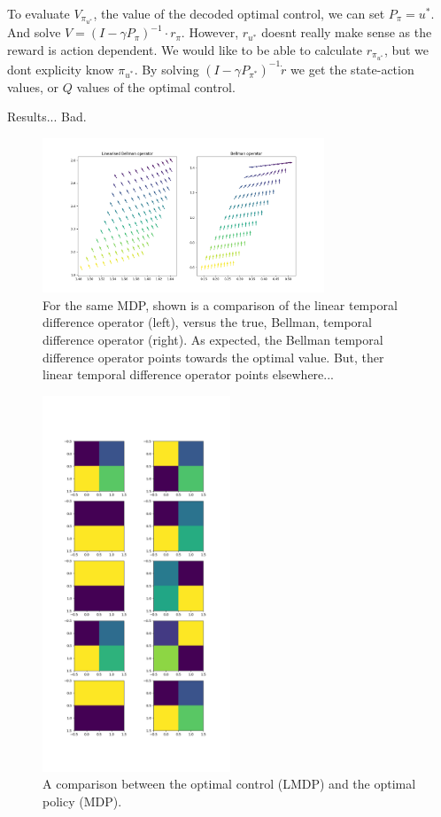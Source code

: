 To evaluate $V_{\pi_{u^{* }}}$, the value of the decoded optimal control, we can
set $P_{\pi} = u^{* }$. And solve $V = (I - \gamma P_{\pi})^{-1} \cdot r_{\pi}$.
However, $r_{u^{* }}$ doesnt really make sense as the reward is action
dependent. We would like to be able to calculate $r_{\pi_{u^{* } }}$, but we dont
explicity know \(\pi_{u^{* }}\). By solving $(I - \gamma P_{\pi^{* }})^{-1} \dot r$
we get the state-action values, or $Q$ values of the optimal control.

Results... Bad.

\begin{figure}
\centering
\includegraphics[width=0.75\textwidth,height=0.5\textheight]{../../pictures/figures/LBO_BO.png}
\caption{For the same MDP, shown is a comparison of the linear temporal difference operator (left), versus the true, Bellman, temporal difference operator (right). As expected, the Bellman temporal difference operator points towards the optimal value. But, ther linear temporal difference operator points elsewhere...}
\end{figure}

\begin{figure}
\centering
\includegraphics[width=0.5\textwidth,height=0.75\textheight]{../../pictures/figures/lmdp_mdp_optimal_dynamics.png}
\caption{A comparison between the optimal control (LMDP) and the optimal policy (MDP).}
\end{figure}


